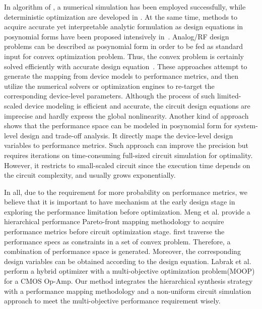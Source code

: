         In algorithm of \cite{Simu_DATE2000}, a numerical simulation has been employed successfully, while deterministic optimization are developed in \cite{MARS_TCAD2012,Habal_TCAD2011}. At the same time, methods to acquire accurate yet interpretable analytic formulation as design equations in posynomial forms have been proposed intensively in~\cite{PWL_Convex_GP,Eeckelaert_DATE2003}. Analog/RF design problems can be described as posynomial form in order to be fed as standard input for convex optimization problem. Thus, the convex problem is certainly solved efficiently with accurate design equation~\cite{Device_CKT_CoOpt_GP}. These approaches attempt to generate the mapping from device models to performance metrics, and then utilize the numerical solvers or optimization engines to re-target the corresponding device-level parameters. Although the process of such limited-scaled device modeling is efficient and accurate, the circuit design equations are imprecise and hardly express the global nonlinearity. Another kind of approach~\cite{RobustPosyMdl_ICCAD2004,PerfCentOpt_ICCAD2005} shows that the performance space can be modeled in posynomial form for system-level design and trade-off analysis. It directly maps the device-level design variables to performance metrics. Such approach can improve the precision but requires iterations on time-consuming full-sized circuit simulation for optimality. However, it restricts to small-scaled circuit since the execution time depends on the circuit complexity, and usually grows exponentially. 

        In all, due to the requirement for more probability on performance metrics, we believe that it is important to have mechanism at the early design stage in exploring the performance limitation before optimization. Meng et al.\cite{PerfMap_ISQED2011} provide a hierarchical performance Pareto-front mapping methodology to acquire performance metrics before circuit optimization stage. \cite{PerfMap_ISQED2011} first traverse the performance specs as constraints in a set of convex problem. Therefore, a combination of performance space is generated. Moreover, the corresponding design variables can be obtained according to the design equation. Labrak et al.~\cite{HybridOpt_MWSCAS2007} perform a hybrid optimizer with a multi-objective optimization problem(MOOP) for a CMOS Op-Amp. Our method integrates the hierarchical synthesis strategy with a performance mapping methodology and a non-uniform circuit simulation approach to meet the multi-objective performance requirement wisely. 


